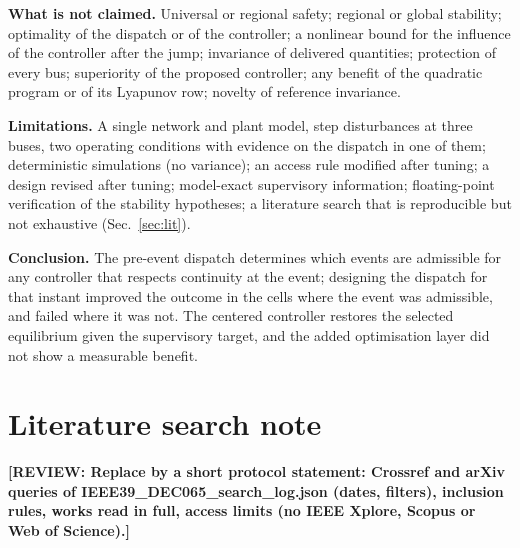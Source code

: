 \documentclass[11pt,twocolumn]{article}
\newcommand{\todo}[1]{\textbf{[REVIEW: #1]}}
\begin{document}
\textbf{What is not claimed.} Universal or regional safety; regional or global stability; optimality of the dispatch or of the controller; a nonlinear bound for the influence of the controller after the jump; invariance of delivered quantities; protection of every bus; superiority of the proposed controller; any benefit of the quadratic program or of its Lyapunov row; novelty of reference invariance.

\textbf{Limitations.} A single network and plant model, step disturbances at three buses, two operating conditions with evidence on the dispatch in one of them; deterministic simulations (no variance); an access rule modified after tuning; a design revised after tuning; model-exact supervisory information; floating-point verification of the stability hypotheses; a literature search that is reproducible but not exhaustive (Sec.~\ref{sec:lit}).

\textbf{Conclusion.} The pre-event dispatch determines which events are admissible for any controller that respects continuity at the event; designing the dispatch for that instant improved the outcome in the cells where the event was admissible, and failed where it was not. The centered controller restores the selected equilibrium given the supervisory target, and the added optimisation layer did not show a measurable benefit.

\section*{Literature search note}
\label{sec:lit}
\todo{Replace by a short protocol statement: Crossref and arXiv queries of IEEE39\_DEC065\_search\_log.json (dates, filters), inclusion rules, works read in full, access limits (no IEEE Xplore, Scopus or Web of Science).}



\end{document}
